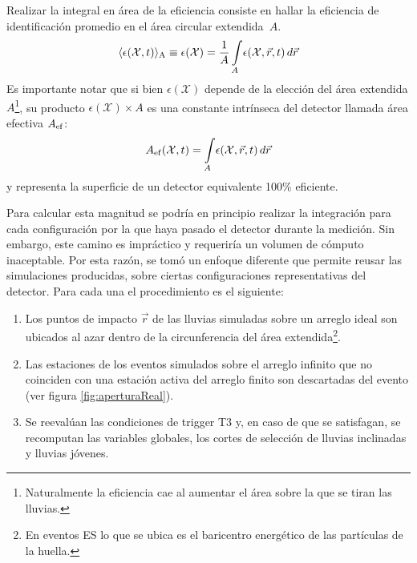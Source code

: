 	Realizar la integral en área de la eficiencia consiste en hallar la eficiencia de identificación promedio en el área circular extendida~$A$.
	\begin{equation}
	\langle\epsilon(\mathcal{X},t)\rangle_{\rm A} \equiv \epsilon(\mathcal{X}) =
	\frac{1}{A}
	\int\limits_{A}\!\epsilon(\mathcal{X},\vec{r},t)\,d\vec{r}
	\end{equation}
	Es importante notar que si bien $\epsilon(\mathcal{X})$ depende de la elección del área extendida $A$\footnote{Naturalmente la eficiencia cae al aumentar el \'area sobre la que se tiran las lluvias.}, su producto $\epsilon(\mathcal{X})\times A$ es una constante intrínseca del detector llamada área efectiva $A_{\rm ef}$:
	\begin{equation}
	A_{\rm ef}(\mathcal{X},t)=\int\limits_{A}\!\epsilon(\mathcal{X},\vec{r},t)\,d\vec{r}
	\label{eq:Aeff}
	\end{equation}
	y representa la superficie de un detector equivalente 100\% eficiente.
	
	Para calcular esta magnitud se podría en principio realizar la integraci\'on para cada configuración por la que haya pasado el detector durante la medici\'on.
	Sin embargo, este camino es impráctico y requeriría un volumen de cómputo inaceptable.
	Por esta razón, se tom\'o un enfoque diferente que permite reusar las simulaciones producidas, sobre ciertas configuraciones representativas del detector.
	Para cada una el procedimiento es el siguiente:
	\begin{enumerate}
	 \item Los puntos de impacto $\vec{r}$ de las lluvias simuladas sobre un arreglo ideal son ubicados al azar dentro de la circunferencia del área extendida\footnote{En eventos ES lo que se ubica es el baricentro energ\'etico de las part\'iculas de la huella.}.
	 \item Las estaciones de los eventos simulados sobre el arreglo infinito que no coinciden con una estación activa del arreglo finito son descartadas del evento (ver figura \ref{fig:aperturaReal}).
	 \item Se reevalúan las condiciones de trigger T3 y, en caso de que se satisfagan, se recomputan las variables globales, los cortes de selección de lluvias inclinadas y lluvias jóvenes.
	\end{enumerate}

